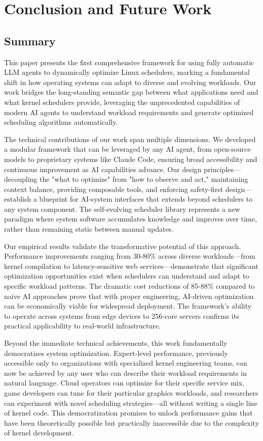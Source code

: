 \section{Conclusion and Future Work}

\subsection{Summary}

This paper presents the first comprehensive framework for using fully automatic LLM agents to dynamically optimize Linux schedulers, marking a fundamental shift in how operating systems can adapt to diverse and evolving workloads. Our work bridges the long-standing semantic gap between what applications need and what kernel schedulers provide, leveraging the unprecedented capabilities of modern AI agents to understand workload requirements and generate optimized scheduling algorithms automatically.

The technical contributions of our work span multiple dimensions. We developed a modular framework that can be leveraged by any AI agent, from open-source models to proprietary systems like Claude Code, ensuring broad accessibility and continuous improvement as AI capabilities advance. Our design principles—decoupling the "what to optimize" from "how to observe and act," maintaining context balance, providing composable tools, and enforcing safety-first design—establish a blueprint for AI-system interfaces that extends beyond schedulers to any system component. The self-evolving scheduler library represents a new paradigm where system software accumulates knowledge and improves over time, rather than remaining static between manual updates.

Our empirical results validate the transformative potential of this approach. Performance improvements ranging from 30-80\% across diverse workloads—from kernel compilation to latency-sensitive web services—demonstrate that significant optimization opportunities exist when schedulers can understand and adapt to specific workload patterns. The dramatic cost reductions of 85-88\% compared to naive AI approaches prove that with proper engineering, AI-driven optimization can be economically viable for widespread deployment. The framework's ability to operate across systems from edge devices to 256-core servers confirms its practical applicability to real-world infrastructure.

Beyond the immediate technical achievements, this work fundamentally democratizes system optimization. Expert-level performance, previously accessible only to organizations with specialized kernel engineering teams, can now be achieved by any user who can describe their workload requirements in natural language. Cloud operators can optimize for their specific service mix, game developers can tune for their particular graphics workloads, and researchers can experiment with novel scheduling strategies—all without writing a single line of kernel code. This democratization promises to unlock performance gains that have been theoretically possible but practically inaccessible due to the complexity of kernel development.

